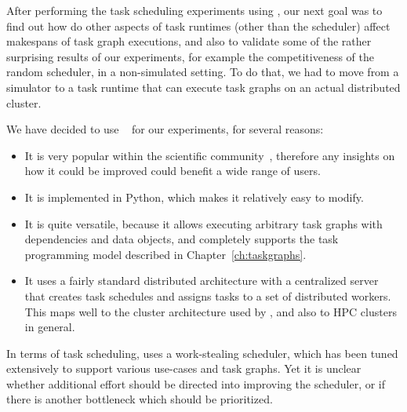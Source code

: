 
After performing the task scheduling experiments using \estee{}, our next goal was to
find out how do other aspects of task runtimes (other than the scheduler) affect makespans of task
graph executions, and also to validate some of the rather surprising results of our experiments,
for example the competitiveness of the random scheduler, in a non-simulated setting. To do that, we
had to move from a simulator to a task runtime that can execute task graphs on an actual
distributed cluster.

We have decided to use \dask{}~\cite{dask} for our experiments, for
several reasons:
\begin{itemize}
	\setlength\itemsep{0.1em}
	\item It is very popular within the scientific community~\cite{dask-user-survey}, therefore any insights on
	      how it could be improved could benefit a wide range of users.
	\item It is implemented in Python, which makes it relatively easy to modify.
	\item It is quite versatile, because it allows executing arbitrary task graphs with dependencies and data
	      objects, and completely supports the task programming model described in
	      Chapter~\ref{ch:taskgraphs}.
	\item It uses a fairly standard distributed architecture with a centralized server that creates task
	      schedules and assigns tasks to a set of distributed workers. This maps well to the cluster
	      architecture used by \estee{}, and also to HPC clusters in general.
\end{itemize}

In terms of task scheduling, \dask{} uses a work-stealing scheduler, which has been
tuned extensively to support various use-cases and task graphs. Yet it is unclear whether
additional effort should be directed into improving the scheduler, or if there is another
bottleneck which should be prioritized.

